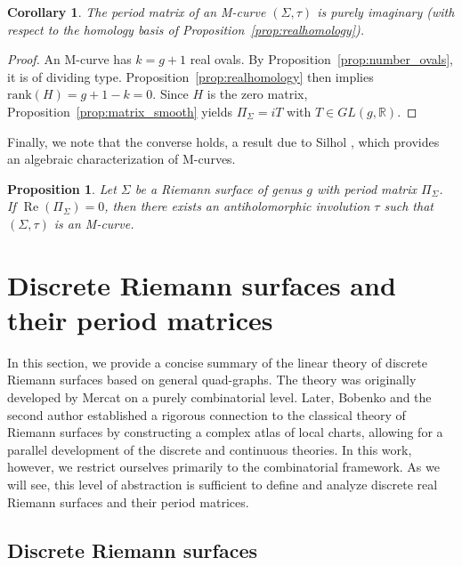 \documentclass[11pt,a4paper]{article}
\newtheorem{proposition}[theorem]{Proposition}
\newtheorem{corollary}[theorem]{Corollary}
\theoremstyle{definition}
\newcommand{\R}{\mathds{R}}
\renewcommand{\Re}{\operatorname{Re}}
\begin{document}
\begin{corollary}\label{cor:m-curve}
	The period matrix of an M-curve $(\Sigma,\tau)$ is purely imaginary (with respect to the homology basis of Proposition~\ref{prop:realhomology}).
\end{corollary}

\begin{proof}
	An M-curve has $k=g+1$ real ovals. By Proposition~\ref{prop:number_ovals}, it is of dividing type. Proposition~\ref{prop:realhomology} then implies $\mathrm{rank}(H) = g+1 - k = 0$. Since $H$ is the zero matrix, Proposition~\ref{prop:matrix_smooth} yields $\Pi_{\Sigma} = iT$ with $T \in GL(g,\R)$.
\end{proof}

Finally, we note that the converse holds, a result due to Silhol \cite{Sil01}, which provides an algebraic characterization of M-curves.

\begin{proposition}\label{prop:Silhol_converse}
	Let $\Sigma$ be a Riemann surface of genus $g$ with period matrix $\Pi_{\Sigma}$. If $\Re(\Pi_{\Sigma}) = 0$, then there exists an antiholomorphic involution $\tau$ such that $(\Sigma,\tau)$ is an M-curve.
\end{proposition}


\section{Discrete Riemann surfaces and their period matrices}\label{sec:basic}

In this section, we provide a concise summary of the linear theory of discrete Riemann surfaces based on general quad-graphs. The theory was originally developed by Mercat \cite{Me01} on a purely combinatorial level. Later, Bobenko and the second author \cite{BoG17} established a rigorous connection to the classical theory of Riemann surfaces by constructing a complex atlas of local charts, allowing for a parallel development of the discrete and continuous theories.
In this work, however, we restrict ourselves primarily to the combinatorial framework. As we will see, this level of abstraction is sufficient to define and analyze discrete real Riemann surfaces and their period matrices.

\subsection{Discrete Riemann surfaces}\label{sec:Riemann}
\end{document}
